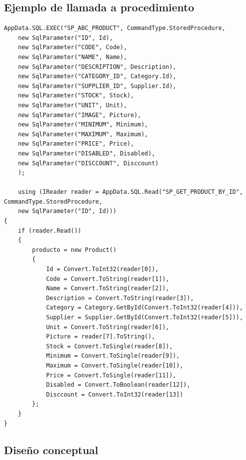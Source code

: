 \documentclass[a4paper,DIV=12]{scrreprt}
\begin{document}
\subsection{Ejemplo de llamada a procedimiento}

\begin{lstlisting}[language={[Sharp]C}]
    AppData.SQL.EXEC("SP_ABC_PRODUCT", CommandType.StoredProcedure,
    new SqlParameter("ID", Id),
    new SqlParameter("CODE", Code),
    new SqlParameter("NAME", Name),
    new SqlParameter("DESCRIPTION", Description),
    new SqlParameter("CATEGORY_ID", Category.Id),
    new SqlParameter("SUPPLIER_ID", Supplier.Id),
    new SqlParameter("STOCK", Stock),
    new SqlParameter("UNIT", Unit),
    new SqlParameter("IMAGE", Picture),
    new SqlParameter("MINIMUM", Minimum),
    new SqlParameter("MAXIMUM", Maximum),
    new SqlParameter("PRICE", Price),
    new SqlParameter("DISABLED", Disabled),
    new SqlParameter("DISCCOUNT", Disccount)
    );

    using (IReader reader = AppData.SQL.Read("SP_GET_PRODUCT_BY_ID", CommandType.StoredProcedure, 
    new SqlParameter("ID", Id)))
{
    if (reader.Read())
    {
        producto = new Product()
        {
            Id = Convert.ToInt32(reader[0]),
            Code = Convert.ToString(reader[1]),
            Name = Convert.ToString(reader[2]),
            Description = Convert.ToString(reader[3]),
            Category = Category.GetById(Convert.ToInt32(reader[4])),
            Supplier = Supplier.GetById(Convert.ToInt32(reader[5])),
            Unit = Convert.ToString(reader[6]),
            Picture = reader[7].ToString(),
            Stock = Convert.ToSingle(reader[8]),
            Minimum = Convert.ToSingle(reader[9]),
            Maximum = Convert.ToSingle(reader[10]),
            Price = Convert.ToSingle(reader[11]),
            Disabled = Convert.ToBoolean(reader[12]),
            Disccount = Convert.ToInt32(reader[13])
        };
    }
}
\end{lstlisting}


\newpage
\setcounter{section}{2}
\setcounter{subsection}{-1}
\subsection{Diseño conceptual}
\end{document}
